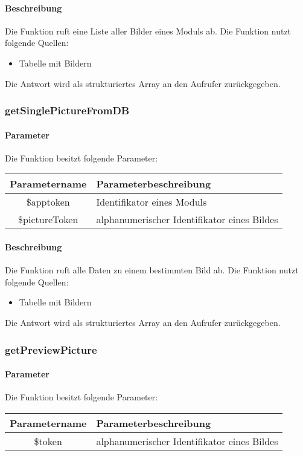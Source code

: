 \paragraph{Beschreibung} Die Funktion ruft eine Liste aller Bilder eines Moduls ab. Die Funktion nutzt folgende Quellen:
\begin{itemize}
	\item Tabelle mit Bildern
\end{itemize}
Die Antwort wird als strukturiertes Array an den Aufrufer zurückgegeben.
\subsubsection{getSinglePictureFromDB}
\paragraph{Parameter} Die Funktion besitzt folgende Parameter:
\begin{table}[H]
	\begin{tabular}{|c|p{11cm}|}
		\hline
		\textbf{Parametername} & \textbf{Parameterbeschreibung} \\ \hline
		\$apptoken     & Identifikator eines Moduls \\ \hline
		\$pictureToken & alphanumerischer Identifikator eines Bildes \\ \hline
	\end{tabular}
\end{table}
\paragraph{Beschreibung} Die Funktion ruft alle Daten zu einem bestimmten Bild ab. Die Funktion nutzt folgende Quellen:
\begin{itemize}
	\item Tabelle mit Bildern
\end{itemize}
Die Antwort wird als strukturiertes Array an den Aufrufer zurückgegeben.
\subsubsection{getPreviewPicture}
\paragraph{Parameter} Die Funktion besitzt folgende Parameter:
\begin{table}[H]
	\begin{tabular}{|c|p{11cm}|}
		\hline
		\textbf{Parametername} & \textbf{Parameterbeschreibung} \\ \hline
		\$token & alphanumerischer Identifikator eines Bildes \\ \hline
	\end{tabular}
\end{table}
